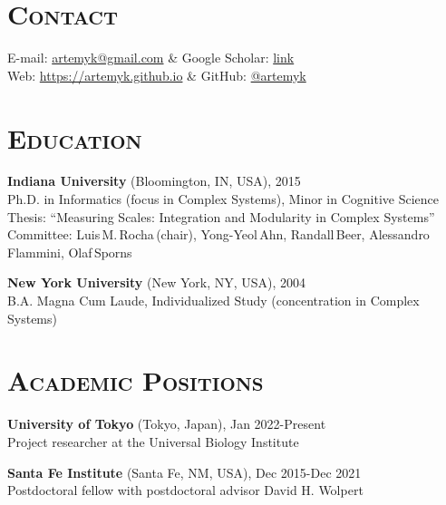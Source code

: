 \documentclass[margin,line,centered]{res}
\begin{document}
\address{Universal Biology Institute, University of Tokyo}

\begin{resume}

\section{\textsc{Contact}}

\begin{ncolumn}{2}
E-mail: \href{mailto:artemyk@gmail.com}{artemyk@gmail.com} & Google Scholar: \href{https://scholar.google.com/citations?user=RmRwJJIAAAAJ\&sortby=pubdate}{link}\\
\hspace{7pt}  Web: \href{https://artemyk.github.io}{https://artemyk.github.io} & \hspace{30pt} GitHub: \href{https://github.com/artemyk/}{@artemyk}
\end{ncolumn}

\section{\textsc{Education}}

\textbf{Indiana University} (Bloomington, IN, USA), 2015\\
Ph.D. in Informatics (focus in Complex Systems), Minor in Cognitive
Science\\
Thesis: ``Measuring Scales: Integration and Modularity in Complex
Systems''\\
Committee: Luis\,M.\,Rocha\,(chair), Yong-Yeol\,Ahn, Randall\,Beer, Alessandro\,Flammini, Olaf\,Sporns

\textbf{New York University} (New York, NY, USA), 2004 \\
B.A. Magna Cum Laude, Individualized Study (concentration in Complex
Systems)


\section{\textsc{Academic Positions}}

\textbf{University of Tokyo} (Tokyo, Japan), Jan 2022-Present \\
Project researcher at the Universal Biology Institute

\textbf{Santa Fe Institute} (Santa Fe, NM, USA), Dec 2015-Dec 2021 \\
Postdoctoral fellow with postdoctoral advisor David H. Wolpert


\end{resume}
\end{document}
